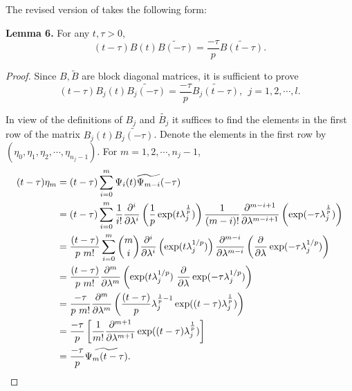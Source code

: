 	
	The revised version of \citep[Lemma 6 (eqn. (35))]{deshpande2016local} takes the following form:
	
	\textbf{Lemma 6.}\label{lem6}
		For any $t, \tau > 0$,
		\begin{equation}
		(t-\tau) B(t) \widetilde{B(-\tau)} = \frac{- \tau}{p} \widetilde{B(t-\tau)}.
		\end{equation}
		
		\begin{proof}
			Since $B, \widetilde{B}$ are block diagonal matrices, it is sufficient to prove 
			\begin{equation}
			(t-\tau) B_j(t) \widetilde{B_j(-\tau)} = \frac{-\tau}{p} \widetilde{B_j (t-\tau)}, ~~j=1,2,\cdots,l.
			\end{equation}
			
			In view of the definitions of $B_j$ and $\widetilde{B_j}$ it suffices to find the elements in the first row of the matrix $B_j(t) \widetilde{B_j (-\tau)}$. Denote the elements in the first row by $(\eta_0, \eta_1, \eta_2, \cdots, \eta_{n_j -1})$. For $m=1,2, \cdots, n_j -1$, 
			\begin{align}
				(t-\tau) \eta_m &= (t-\tau) \sum_{i=0}^{m} \Psi_i(t) \widetilde{\Psi_{m-i}} (-\tau) \\ &= (t-\tau) \sum_{i=0}^{m} \frac{1}{i!} \dfrac{\partial^{i}}{\partial \lambda^{i}}\left( \frac{1}{p}\exp(t\lambda_j^{\frac{1}{p}})\right) \frac{1}{(m-i)!} \dfrac{\partial^{m-i+1}}{\partial \lambda^{m-i+1}}\left( \exp(-\tau\lambda_j^{\frac{1}{p}})\right)\\
				&= \frac{(t-\tau)}{p ~m!}\sum_{i=0}^{m} \binom{m}{i} \dfrac{\partial^{i}}{\partial \lambda^{i}}\left( \exp(t\lambda_j^{1/p})\right) \dfrac{\partial^{m-i}}{\partial \lambda^{m-i}}\left( \dfrac{\partial^{ }}{\partial \lambda^{ }}\exp(-\tau\lambda_j^{1/p})\right) \\
				&= \frac{(t-\tau)}{p~m!} \dfrac{\partial^{m}}{\partial \lambda^{m}}\left( \exp(t\lambda_j^{1/p})~ \dfrac{\partial^{ }}{\partial \lambda^{ }}\exp(-\tau\lambda_j^{1/p}) \right)\\
				&= \frac{-\tau}{p~m!} \dfrac{\partial^{m}}{\partial \lambda^{m}} \left( \frac{(t-\tau)}{p} \lambda_j ^{\frac{1}{p}-1} \exp((t-\tau) \lambda_j ^{\frac{1}{p}})	\right)\\
				& = \frac{-\tau}{p}\left[ \frac{1}{m!} \dfrac{\partial^{m+1}}{\partial \lambda^{m+1}} \exp((t-\tau) \lambda_j ^{\frac{1}{p}}) \right] \\
				&= \frac{-\tau}{p} \widetilde{\Psi_m (t-\tau)}. 			
			\end{align} 
		\end{proof}


